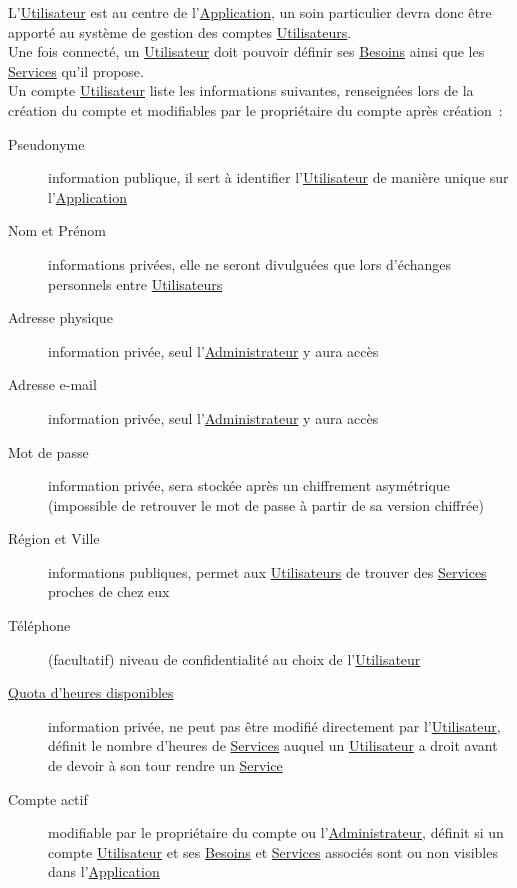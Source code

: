 \documentclass[french,12pt]{article}
\begin{document}
			L’\hyperlink{utilisateur}{Utilisateur} est au centre de
			 l’\hyperlink{application}{Application}, un soin particulier devra donc
			 être apporté au système de gestion des comptes
			 \hyperlink{utilisateur}{Utilisateurs}.\\
			Une fois connecté, un \hyperlink{utilisateur}{Utilisateur} doit pouvoir
			 définir ses \hyperlink{besoin}{Besoins} ainsi que les
			 \hyperlink{service}{Services} qu’il propose.\\
			
			Un compte \hyperlink{utilisateur}{Utilisateur} liste les informations
			 suivantes, renseignées lors de la création du compte et modifiables par
			 le propriétaire du compte après création :
			\begin{description}
				\item [Pseudonyme]
					information publique, il sert à identifier
					 l’\hyperlink{utilisateur}{Utilisateur} de manière unique sur
					 l’\hyperlink{application}{Application}
				\item [Nom et Prénom]
					informations privées, elle ne seront divulguées que lors d’échanges
					 personnels entre \hyperlink{utilisateur}{Utilisateurs}
				\item [Adresse physique]
					information privée, seul l’\hyperlink{administrateur}{Administrateur}
					 y aura accès
				\item [Adresse e-mail]
					information privée, seul l’\hyperlink{administrateur}{Administrateur}
					 y aura accès
				\item [Mot de passe]
					information privée, sera stockée après un chiffrement asymétrique
					 (impossible de retrouver le mot de passe à partir de sa version
					 chiffrée)
				\item [Région et Ville]
					informations publiques, permet aux
					 \hyperlink{utilisateur}{Utilisateurs} de trouver des
					 \hyperlink{service}{Services} proches de chez eux
				\item [Téléphone]
					(facultatif) niveau de confidentialité au choix de
					 l’\hyperlink{utilisateur}{Utilisateur}
				\item [\hyperlink{quota}{Quota d’heures disponibles}]
					information privée, ne peut pas être modifié directement par
					 l’\hyperlink{utilisateur}{Utilisateur}, définit le nombre d’heures de
					 \hyperlink{service}{Services} auquel un
					 \hyperlink{utilisateur}{Utilisateur} a droit avant de devoir à son
					 tour rendre un \hyperlink{service}{Service}
				\item [Compte actif]
					modifiable par le propriétaire du compte ou
					 l’\hyperlink{administrateur}{Administrateur}, définit si un compte
					 \hyperlink{utilisateur}{Utilisateur} et ses
					 \hyperlink{besoin}{Besoins} et \hyperlink{service}{Services} associés
					 sont ou non visibles dans l’\hyperlink{application}{Application}
			\end{description}
			
\end{document}
